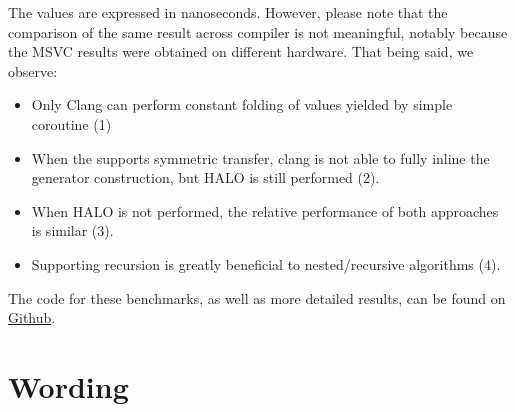 \documentclass{wg21}
\begin{document}


The values are expressed in nanoseconds. However, please note that the comparison of the same result across compiler is not meaningful, notably because the MSVC results were obtained on different hardware.
That being said, we observe:

\begin{itemize}
    \item Only Clang can perform constant folding of values yielded by simple coroutine (1)
    \item When the  supports symmetric transfer, clang is not able to fully inline the generator construction, but HALO is still performed (2).
    \item When HALO is not performed, the relative performance of both approaches is similar (3).
    \item Supporting recursion is greatly beneficial to nested/recursive algorithms (4).
\end{itemize}

The code for these benchmarks, as well as more detailed results, can be found on \href{https://github.com/cor3ntin/coro_benchmark}{Github}.

\newenvironment{draftnote}
    {\color{blue} Drafting Note:}
    {}

\newpage
\section{Wording}
\end{document}
